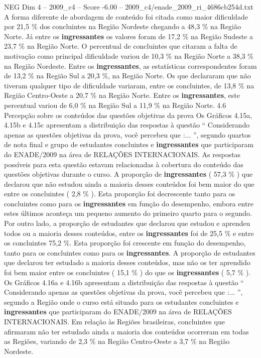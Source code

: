 \begin{textsample}{NEG Dim 4 – 2009\_c4 – Score -6.00 – 2009\_c4/enade\_2009\_ri\_4686cb254d.txt}
A forma diferente de abordagem de conteúdo foi citada como maior dificuldade por 21,5 \% dos concluintes na Região Nordeste chegando a 48,3 \% na Região Norte.
Já entre os \textbf{ingressantes} os valores foram de 17,2 \% na Região Sudeste a 23,7 \% na Região Norte.
O percentual de concluintes que citaram a falta de motivação como principal dificuldade variou de 10,3 \% na Região Norte a 38,3 \% na Região Nordeste.
Entre os \textbf{ingressantes}, as estatísticas correspondentes foram de 13,2 \% na Região Sul a 20,3 \%, na Região Norte.
Os que declararam que não tiveram qualquer tipo de dificuldade variaram, entre os concluintes, de 13,8 \% na Região Centro-Oeste a 20,7 \% na Região Norte.
Entre os \textbf{ingressantes}, este percentual variou de 6,0 \% na Região Sul a 11,9 \% na Região Norte. 4.6 Percepção sobre os conteúdos das questões objetivas da prova Os Gráficos 4.15a, 4.15b e 4.15c apresentam a distribuição das respostas à questão “ Considerando apenas as questões objetivas da prova, você percebeu que :... ”, segundo quartos de nota final e grupo de estudantes concluintes e \textbf{ingressantes} que participaram do ENADE/2009 na área de RELAÇÕES INTERNACIONAIS.
As respostas possíveis para esta questão estavam relacionadas à cobertura do conteúdo das questões objetivas durante o curso.
A proporção de \textbf{ingressantes} ( 57,3 \% ) que declarou que não estudou ainda a maioria desses conteúdos foi bem maior do que entre os concluintes ( 2,8 \% ).
Esta proporção foi decrescente tanto para os concluintes como para os \textbf{ingressantes} em função do desempenho, embora entre estes últimos aconteça um pequeno aumento do primeiro quarto para o segundo.
Por outro lado, a proporção de estudantes que declarou que estudou e aprendeu todos ou a maioria desses conteúdos, entre os \textbf{ingressantes} foi de 25,5 \% e entre os concluintes 75,2 \%.
Esta proporção foi crescente em função do desempenho, tanto para os concluintes como para os \textbf{ingressantes}.
A proporção de estudantes que declarou ter estudado a maioria desses conteúdos, mas não os ter aprendido foi bem maior entre os concluintes ( 15,1 \% ) do que os \textbf{ingressantes} ( 5,7 \% ).
Os Gráficos 4.16a e 4.16b apresentam a distribuição das respostas à questão “ Considerando apenas as questões objetivas da prova, você percebeu que :... ”, segundo a Região onde o curso está situado para os estudantes concluintes e \textbf{ingressantes} que participaram do ENADE/2009 na área de RELAÇÕES INTERNACIONAIS.
Em relação às Regiões brasileiras, concluintes que afirmaram não ter estudado ainda a maioria dos conteúdos ocorreram em todas as Regiões, variando de 2,3 \% na Região Centro-Oeste a 3,7 \% na Região Nordeste.

\end{textsample}
